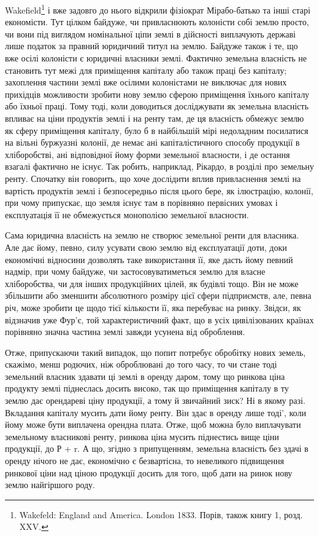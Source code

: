 \parcont{}  %
Wakefield\footnote{
Wakefeld: England and America. London 1833. Порів, також книгу 1, розд. XXV.
} і вже задовго до нього відкрили фізіократ Мірабо-батько та інші
старі економісти. Тут цілком байдуже, чи привласнюють колоністи собі землю
просто, чи вони під виглядом номінальної ціпи землі в дійсності виплачують державі
лише податок за правний юридичний титул на землю. Байдуже також і те, що вже
осілі колоністи є юридичні власники землі. Фактично земельна власність не
становить тут межі для приміщення капіталу або також праці без капіталу;
захоплення частини землі вже осілими колоністами не виключає для нових
прихідців можливости зробити нову землю сферою приміщення їхнього капіталу
або їхньої праці. Тому тоді, коли доводиться досліджувати як земельна власність
впливає на ціни продуктів землі і на ренту там, де ця власність обмежує
землю як сферу приміщення капіталу, було б в найбільшій мірі недоладним
посилатися на вільні буржуазні колонії, де немає ані капіталістичного способу
продукції в хліборобстві, ані відповідної йому форми земельної власности, і де
остання взагалі фактично не існує. Так робить, наприклад, Рікардо, в розділі
про земельну ренту. Спочатку він говорить, що хоче дослідити вплив привласнення
землі на вартість продуктів землі і безпосередньо після цього бере, як
ілюстрацію, колонії, при чому припускає, що земля існує там в порівняно
первісних умовах і експлуатація її не обмежується монополією земельної
власности.

Сама юридична власність на землю не створює земельної ренти для власника.
Але дає йому, певно, силу усувати свою землю від експлуатації доти,
доки економічні відносини дозволять таке використання її, яке дасть йому
певний надмір, при чому байдуже, чи застосовуватиметься землю для власне
хліборобства, чи для інших продукційних цілей, як будівлі тощо. Він не може
збільшити або зменшити абсолютного розміру цієї сфери підприємств, але, певна
річ, може зробити це щодо тієї кількости її, яка перебуває на ринку. Звідси,
як відзначив уже Фур’є, той характеристичний факт, що в усіх цивілізованих
країнах порівняно значна частина землі завжди усунена від оброблення.

Отже, припускаючи такий випадок, що попит потребує обробітку нових
земель, скажімо, менш родючих, ніж оброблювані до того часу, то чи стане
тоді земельний власник здавати ці землі в оренду даром, тому що ринкова
ціна продукту землі піднеслась досить високо, так що приміщення капіталу
в ту землю дає орендареві ціну продукції, а тому й звичайний зиск? Ні в якому
разі. Вкладання капіталу мусить дати йому ренту. Він здає в оренду лише тоді',
коли йому може бути виплачена орендна плата. Отже, щоб можна було виплачувати
земельному власникові ренту, ринкова ціна мусить піднестись вище
ціни продукції, до Р + r. А що, згідно з припущенням, земельна власність
без здачі в оренду нічого не дає, економічно є безвартісна, то невеликого підвищення
ринкової ціни над ціною продукції досить для того, щоб дати на ринок
нову землю найгіршого роду.


